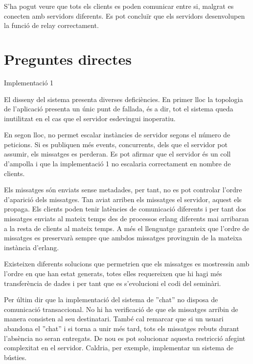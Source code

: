 \documentclass[a4paper, 11pt]{article}
\begin{document}
S'ha pogut veure que tots els clients es poden comunicar entre si, malgrat es conecten amb servidors diferents.
Es pot concluïr que els servidors desenvolupen la funció de relay correctament. 

\section{Preguntes directes}


Implementació 1

El disseny del sistema presenta diverses deficiències. En primer lloc la topologia de l'aplicació presenta un únic punt de fallada, és a dir, tot el sistema queda inutilitzat en el cas que el servidor esdevingui inoperatiu. 

En segon lloc, no permet escalar instàncies de servidor segons el número de peticions. Si es publiquen més events, concurrents, dels que el servidor pot assumir, els missatges es perderan.
Es pot afirmar que el servidor és un coll d'ampolla i que la implementació 1 no escalaria correctament en nombre de clients. 

Els missatges són enviats sense metadades, per tant, no es pot controlar l'ordre d'aparició dels missatges. Tan aviat arriben els missatges el servidor, aquest els propaga. Els clients poden tenir latències de comunicació diferents i per tant dos missatges enviats al mateix temps des de processos erlang diferents mai arribaran a la resta de clients al mateix temps. A més el llenguatge garanteix que l'ordre de missatges es preservar\`a sempre que ambdos missatges provinguin de la mateixa inst\`ancia d'erlang.

Existeixen diferents solucions que permetrien que els missatges es mostressin amb l'ordre en que han estat generats, totes elles requereixen que hi hagi més transferència de dades i per tant que es s'evolucioni el codi del seminàri. 

Per últim dir que la implementació del sistema de ''chat'' no disposa de comunicació transaccional. No hi ha verificació de que els missatges arribin de manera consisten al seu destinatari. També cal remarcar que si un usuari abandona el ''chat'' i si torna a unir més tard, tots els missatges rebuts durant l'absència no seran entregats. 
De nou es pot solucionar aquesta restricció afegint complexitat en el servidor. Caldria, per exemple, implementar un sistema de bústies. 
\end{document}
